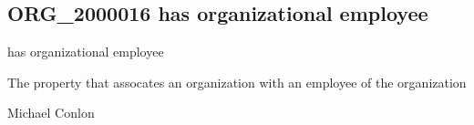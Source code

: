 \documentclass[letterpaper,10pt,english]{sphinxmanual}
\begin{document}
\subsection{ORG\_2000016 \sphinxhyphen{} has organizational employee}
\label{\detokenize{doc-ORG_2000016:org-2000016-has-organizational-employee}}\label{\detokenize{doc-ORG_2000016:index-0}}\label{\detokenize{doc-ORG_2000016::doc}}
\begin{sphinxShadowBox}

\sphinxAtStartPar
has organizational employee
\end{sphinxShadowBox}

\begin{sphinxShadowBox}

\sphinxAtStartPar
{}
\end{sphinxShadowBox}

\begin{sphinxShadowBox}

\sphinxAtStartPar
The property that assocates an organization with an employee of the organization
\end{sphinxShadowBox}

\begin{sphinxShadowBox}

\sphinxAtStartPar
Michael Conlon 
\end{sphinxShadowBox}

\begin{sphinxShadowBox}

\sphinxAtStartPar
{\hyperref[\detokenize{doc-ORG_0000001::doc}]{}}
\end{sphinxShadowBox}

\begin{sphinxShadowBox}

\sphinxAtStartPar
{\hyperref[\detokenize{doc-NCBITaxon_9606::doc}]{}}
\end{sphinxShadowBox}

\begin{sphinxShadowBox}

\sphinxAtStartPar
{\hyperref[\detokenize{doc-ORG_2000017::doc}]{}}
\end{sphinxShadowBox}
\end{document}
